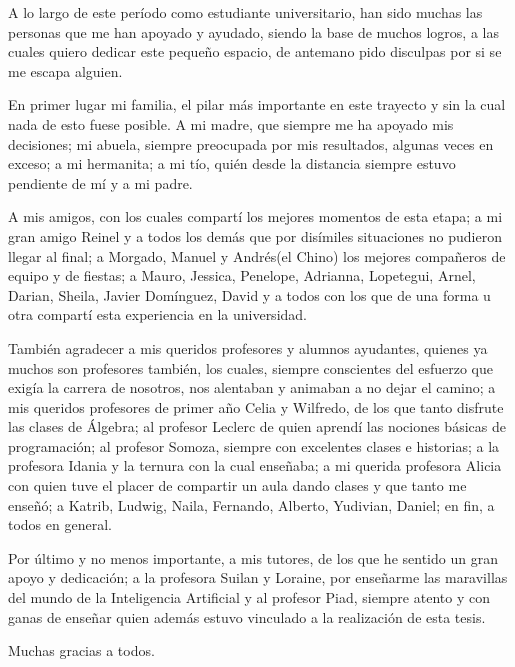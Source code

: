 \begin{acknowledgements}
    A lo largo de este período como estudiante universitario, han sido muchas
    las personas que me han apoyado y ayudado, siendo la base de muchos logros,
    a las cuales quiero dedicar este pequeño espacio, de antemano pido disculpas
    por si se me escapa alguien.
    
    En primer lugar mi familia, el pilar más importante en este trayecto y sin
    la cual nada de esto fuese posible. A mi madre, que siempre me ha apoyado
    mis decisiones; mi abuela, siempre preocupada por mis resultados, algunas
    veces en exceso; a mi hermanita; a mi tío, quién desde la distancia siempre
    estuvo pendiente de mí y a mi padre.

    A mis amigos, con los cuales compartí los mejores momentos de esta etapa;
    a mi gran amigo Reinel y a todos los demás que por disímiles situaciones
    no pudieron llegar al final; a Morgado, Manuel y Andrés(el Chino) los
    mejores compañeros de equipo y de fiestas; a Mauro, Jessica, Penelope,
    Adrianna, Lopetegui, Arnel, Darian, Sheila, Javier Domínguez, David y a
    todos con los que de una forma u otra compartí esta experiencia en la
    universidad.

    También agradecer a mis queridos profesores y alumnos ayudantes, quienes ya
    muchos son profesores también, los cuales, siempre conscientes del esfuerzo
    que exigía la carrera de nosotros, nos alentaban y animaban a no dejar el
    camino; a mis queridos profesores de primer año Celia y Wilfredo, de los
    que tanto disfrute las clases de Álgebra; al profesor Leclerc de quien
    aprendí las nociones básicas de programación; al profesor Somoza, siempre
    con excelentes clases e historias; a la profesora Idania y la ternura con la
    cual enseñaba; a mi querida profesora Alicia con quien tuve el placer de
    compartir un aula dando clases y que tanto me enseñó; a Katrib, Ludwig,
    Naila, Fernando, Alberto, Yudivian, Daniel; en fin, a todos en general.

    Por último y no menos importante, a mis tutores, de los que he sentido un
    gran apoyo y dedicación; a la profesora Suilan y Loraine, por enseñarme
    las maravillas del mundo de la Inteligencia Artificial y al profesor Piad,
    siempre atento y con ganas de enseñar quien además estuvo vinculado a la
    realización de esta tesis.

    Muchas gracias a todos.
\end{acknowledgements}
